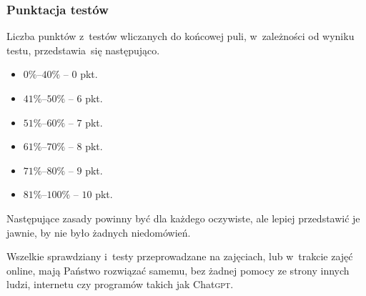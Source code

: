 \documentclass[10pt,t]{beamer}
\begin{document}
\begin{frame}
  \frametitle{Punktacja testów}


  Liczba punktów z~testów wliczanych do końcowej puli, w~zależności od
  wyniku testu, przedstawia~się następująco.

  \vspace{-0.3em}



  \begin{itemize}

  \item $0\%\text{--}40\%$ -- $0$ pkt.

  \item $41\%\text{--}50\%$ -- $6$ pkt.

  \item $51\%\text{--}60\%$ -- $7$ pkt.

  \item $61\%\text{--}70\%$ -- $8$ pkt.

  \item $71\%\text{--}80\%$ -- $9$ pkt.

  \item $81\%\text{--}100\%$ -- $10$ pkt.

  \end{itemize}

  \vspace{-0.3em}




  Następujące zasady powinny być dla każdego oczywiste, ale lepiej
  przedstawić je jawnie, by nie było żadnych niedomówień.

  Wszelkie sprawdziany i~testy przeprowadzane na zajęciach, lub w~trakcie
  zajęć online, mają Państwo rozwiązać \alert{samemu}, bez żadnej pomocy
  ze strony innych ludzi, internetu czy programów takich jak
  Chat\textsc{gpt}.

\end{frame}
\end{document}
